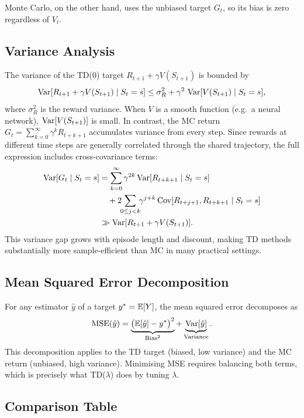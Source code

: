 Monte Carlo, on the other hand, uses the unbiased target $G_t$, so its bias is zero regardless of $V_t$.

\subsection{Variance Analysis}

The variance of the TD(0) target $R_{t+1}+\gamma V(S_{t+1})$ is bounded by
\[
\operatorname{Var}[R_{t+1}+\gamma V(S_{t+1})\mid S_t=s] \le \sigma_R^2 + \gamma^2\,\operatorname{Var}[V(S_{t+1})\mid S_t=s],
\]
where $\sigma_R^2$ is the reward variance.  When $V$ is a smooth function (e.g.\ a neural network), $\operatorname{Var}[V(S_{t+1})]$ is small.  In contrast, the MC return $G_t = \sum_{k=0}^{\infty}\gamma^k R_{t+k+1}$ accumulates variance from every step.  Since rewards at different time steps are generally correlated through the shared trajectory, the full expression includes cross-covariance terms:
\begin{align*}
\operatorname{Var}[G_t\mid S_t=s] &= \sum_{k=0}^{\infty}\gamma^{2k}\operatorname{Var}[R_{t+k+1}\mid S_t=s] \\
&\quad + 2\!\!\sum_{0\le j<k}\!\!\gamma^{j+k}\operatorname{Cov}[R_{t+j+1},R_{t+k+1}\mid S_t=s] \\
&\gg \operatorname{Var}[R_{t+1}+\gamma V(S_{t+1})].
\end{align*}
This variance gap grows with episode length and discount, making TD methods substantially more sample-efficient than MC in many practical settings.

\subsection{Mean Squared Error Decomposition}

For any estimator $\hat y$ of a target $y^* = \operatorname{\mathbb{E}}[Y]$, the mean squared error decomposes as
\begin{equation}
\label{eq:bias-variance-decomp}
\mathrm{MSE}(\hat y) = \underbrace{\bigl(\operatorname{\mathbb{E}}[\hat y] - y^*\bigr)^2}_{\mathrm{Bias}^2} + \underbrace{\operatorname{Var}[\hat y]}_{\mathrm{Variance}}.
\end{equation}
This decomposition applies to the TD target (biased, low variance) and the MC return (unbiased, high variance).  Minimising MSE requires balancing both terms, which is precisely what TD($\lambda$) does by tuning $\lambda$.

\subsection{Comparison Table}

